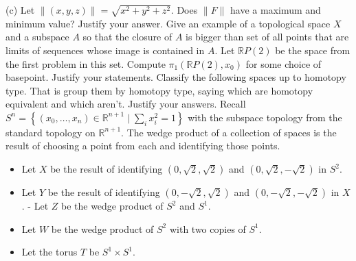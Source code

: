\documentclass[14pt]{extarticle}
\begin{document}
(c) Let $\|(x, y, z)\|=\sqrt{x^{2}+y^{2}+z^{2}}$. Does $\|F\|$ have a maximum and minimum value? Justify your answer.
\newpage
Give an example of a topological space $X$ and a subspace $A$ so that the closure of $A$ is bigger than set of all points that are limits of sequences whose image is contained in $A$.
\newpage
Let $\mathbb{R} P(2)$ be the space from the first problem in this set. Compute $\pi_{1}\left(\mathbb{R} P(2), x_{0}\right)$ for some choice of basepoint. Justify your statements.
\newpage
Classify the following spaces up to homotopy type. That is group them by homotopy type, saying which are homotopy equivalent and which aren't. Justify your answers.
\newpage
Recall $S^{n}=\left\{\left(x_{0}, \ldots, x_{n}\right) \in \mathbb{R}^{n+1} \mid \sum_{i} x_{i}^{2}=1\right\}$ with the subspace topology from the standard topology on $\mathbb{R}^{n+1}$. The wedge product of a collection of spaces is the result of choosing a point from each and identifying those points.
\begin{itemize}
  \item Let $X$ be the result of identifying $(0, \sqrt{2}, \sqrt{2})$ and $(0, \sqrt{2},-\sqrt{2})$ in $S^{2}$.

  \item Let $Y$ be the result of identifying $(0,-\sqrt{2}, \sqrt{2})$ and $(0,-\sqrt{2},-\sqrt{2})$ in $X$. - Let $Z$ be the wedge product of $S^{2}$ and $S^{1}$.

  \item Let $W$ be the wedge product of $S^{2}$ with two copies of $S^{1}$.

  \item Let the torus $T$ be $S^{1} \times S^{1}$.

\end{itemize}
\end{document}
